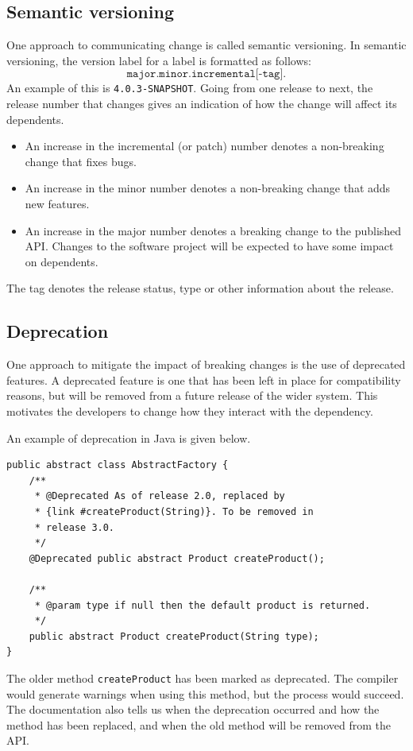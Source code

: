 \documentclass[a4paper, openany]{memoir}
\begin{document}
\subsection{Semantic versioning}
One approach to communicating change is called semantic versioning. In semantic versioning, the version label for a label is formatted as follows:
\[\texttt{major.minor.incremental[-tag]}.\]
An example of this is \texttt{4.0.3-SNAPSHOT}. Going from one release to next, the release number that changes gives an indication of how the change will affect its dependents.
\begin{itemize}
    \item An increase in the incremental (or patch) number denotes a non-breaking change that fixes bugs.
    \item An increase in the minor number denotes a non-breaking change that adds new features.
    \item An increase in the major number denotes a breaking change to the published API. Changes to the software project will be expected to have some impact on dependents.
\end{itemize}
The tag denotes the release status, type or other information about the release.

\subsection{Deprecation}
One approach to mitigate the impact of breaking changes is the use of deprecated features. A deprecated feature is one that has been left in place for compatibility reasons, but will be removed from a future release of the wider system. This motivates the developers to change how they interact with the dependency.

An example of deprecation in Java is given below.
\begin{verbatim}
public abstract class AbstractFactory {
    /**
     * @Deprecated As of release 2.0, replaced by
     * {link #createProduct(String)}. To be removed in 
     * release 3.0.
     */
    @Deprecated public abstract Product createProduct();

    /**
     * @param type if null then the default product is returned.
     */
    public abstract Product createProduct(String type);
}
\end{verbatim}
The older method \texttt{createProduct} has been marked as deprecated. The compiler would generate warnings when using this method, but the process would succeed. The documentation also tells us when the deprecation occurred and how the method has been replaced, and when the old method will be removed from the API.
\end{document}
